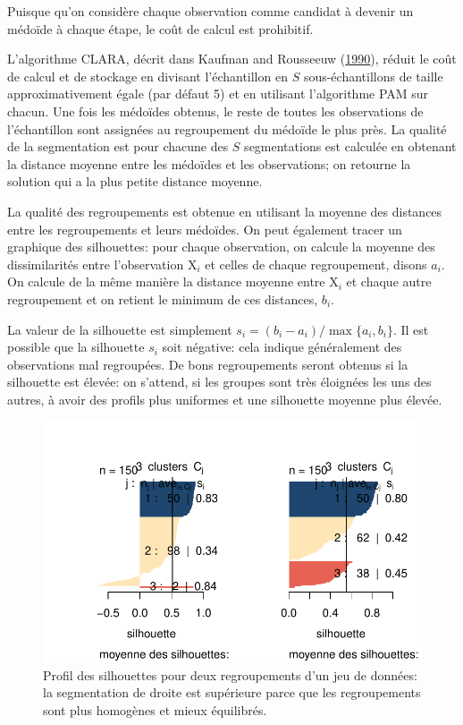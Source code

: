 \documentclass[
  11pt,
  letterpaper,
]{scrbook}
\theoremstyle{definition}
\theoremstyle{remark}
\begin{document}
Puisque qu'on considère chaque observation comme candidat à devenir un
médoïde à chaque étape, le coût de calcul est prohibitif.

L'algorithme CLARA, décrit dans Kaufman and Rousseeuw
(\protect\hyperlink{ref-Kaufman.Rousseeuw:1990}{1990}), réduit le coût
de calcul et de stockage en divisant l'échantillon en \(S\)
sous-échantillons de taille approximativement égale (par défaut 5) et en
utilisant l'algorithme PAM sur chacun. Une fois les médoïdes obtenus, le
reste de toutes les observations de l'échantillon sont assignées au
regroupement du médoïde le plus près. La qualité de la segmentation est
pour chacune des \(S\) segmentations est calculée en obtenant la
distance moyenne entre les médoïdes et les observations; on retourne la
solution qui a la plus petite distance moyenne.

La qualité des regroupements est obtenue en utilisant la moyenne des
distances entre les regroupements et leurs médoïdes. On peut également
tracer un graphique des silhouettes: pour chaque observation, on calcule
la moyenne des dissimilarités entre l'observation \(\mathrm{X}_i\) et
celles de chaque regroupement, disons \(a_i\). On calcule de la même
manière la distance moyenne entre \(\mathrm{X}_i\) et chaque autre
regroupement et on retient le minimum de ces distances, \(b_i\).

La valeur de la silhouette est simplement
\(s_i=(b_i-a_i)/\max\{a_i, b_i\}\). Il est possible que la silhouette
\(s_i\) soit négative: cela indique généralement des observations mal
regroupées. De bons regroupements seront obtenus si la silhouette est
élevée: on s'attend, si les groupes sont très éloignées les uns des
autres, à avoir des profils plus uniformes et une silhouette moyenne
plus élevée.

\begin{figure}[ht!]

{\centering \includegraphics{regroupements_files/figure-pdf/fig-silhouette-1.pdf}

}

\caption{\label{fig-silhouette}Profil des silhouettes pour deux
regroupements d'un jeu de données: la segmentation de droite est
supérieure parce que les regroupements sont plus homogènes et mieux
équilibrés.}

\end{figure}
\end{document}
